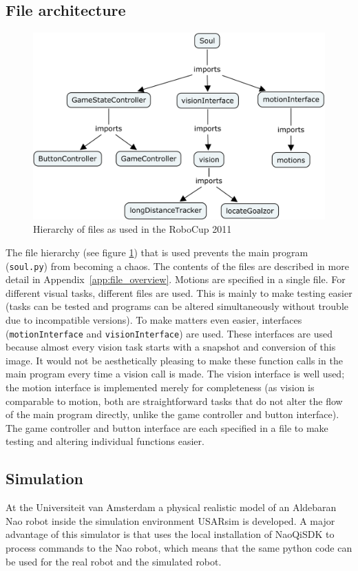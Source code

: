 \documentclass[11pt,a4paper,oneside]{article}
\begin{document}
\subsection{File architecture}
\begin{figure}[htb]    	
\centering
\includegraphics[width=0.7\columnwidth]{cmapFiles.png}
\caption{Hierarchy of files as used in the RoboCup 2011}
\label{fig:File}
\end{figure}
The file hierarchy (see figure \ref{fig:File}) that is used prevents the main program (\texttt{soul.py}) from becoming a chaos. The contents of the files are described in more detail in Appendix~\ref{app:file_overview}.
Motions are specified in a single file. 
For different visual tasks, different files are used. This is mainly to make testing easier (tasks can be tested and programs can be altered simultaneously without trouble due to incompatible versions). 
To make matters even easier, interfaces (\texttt{motionInterface} and \texttt{visionInterface}) are used. These interfaces are used because almost every vision task starts with a snapshot and conversion of this image. 
It would not be aesthetically pleasing to make these function calls in the main program every time a vision call is made. 
The vision interface is well used; the motion interface is implemented merely for completeness (as vision is comparable to motion, both are straightforward tasks that do not alter the flow of the main program directly, unlike the game controller and button interface). The game controller and button interface are each specified in a file to make testing and altering individual functions easier.



\subsection{Simulation}

At the Universiteit van Amsterdam a physical realistic model of an Aldebaran Nao robot inside the simulation environment USARsim \cite{Carpin2007icra} is developed. A major advantage of this simulator is that uses the local installation of NaoQiSDK to process commands to the Nao robot, which means that the same python code can be used for the real robot and the simulated robot. 
\end{document}
